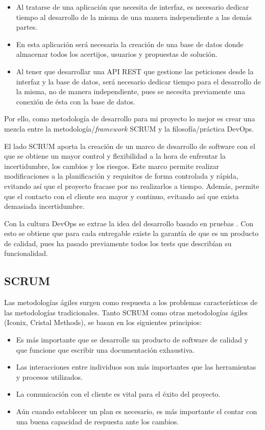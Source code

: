 \begin{itemize}
    \item Al tratarse de una aplicación que necesita de interfaz, es necesario dedicar tiempo al desarrollo de la misma de una manera independiente a las demás partes. 
    \item En esta aplicación será necesaria la creación de una base de datos donde almacenar todos los acertijos, usuarios y propuestas de solución.
    \item Al tener que desarrollar una API REST que gestione las peticiones desde la interfaz y la base de datos, será necesario dedicar tiempo para el desarrollo de la misma, no de manera independiente, pues se necesita previamente una conexión de ésta con la base de datos.
\end{itemize}

Por ello, como metodología de desarrollo para mi proyecto lo mejor es crear una mezcla entre la metodología/\textit{framework} SCRUM y la filosofía/práctica DevOps.

El lado SCRUM aporta la creación de un marco de desarrollo de software con el que se obtiene un mayor control y flexibilidad a la hora de enfrentar la incertidumbre, los cambios y los riesgos. Este marco permite realizar modificaciones a la planificación y requisitos de forma controlada y rápida, evitando así que el proyecto fracase por no realizarlos a tiempo. Además, permite que el contacto con el cliente sea mayor y continuo, evitando así que exista demasiada incertidumbre.

Con la cultura DevOps se extrae la idea del desarrollo basado en pruebas \cite{desarrollotests}\cite{desarrollotests2}. Con esto se obtiene que para cada entregable existe la garantía de que es un producto de calidad, pues ha pasado previamente todos los tests que describían su funcionalidad.

\subsection{SCRUM}

Las metodologías ágiles\cite{scrum} surgen como respuesta a los problemas característicos de las metodologías tradicionales. Tanto SCRUM como otras metodologías ágiles (Iconix, Cristal Methods), se basan en los siguientes principios:

\begin{itemize}
    \item Es más importante que se desarrolle un producto de software de calidad y que funcione que escribir una documentación exhaustiva. 
    \item Las interacciones entre individuos son más importantes que las herramientas y procesos utilizados.
    \item La comunicación con el cliente es vital para el éxito del proyecto.
    \item Aún cuando establecer un plan es necesario, es más importante el contar con una buena capacidad de respuesta ante los cambios.
\end{itemize}

